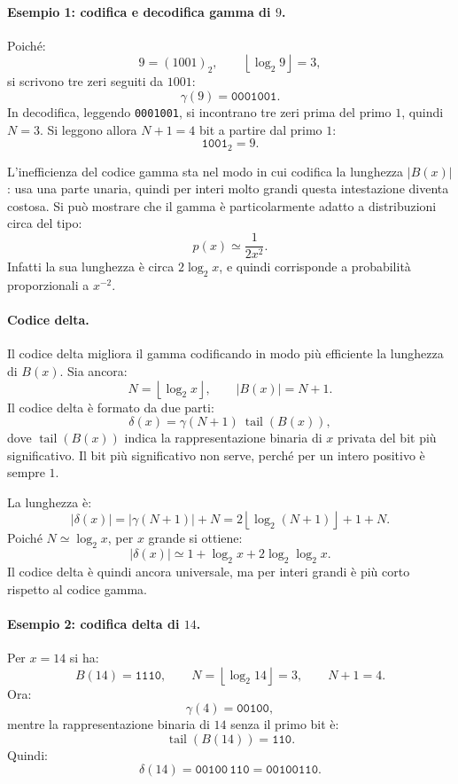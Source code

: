 \documentclass{article}
\theoremstyle{definition}
\numberwithin{equation}{section}
\begin{document}
\paragraph{Esempio 1: codifica e decodifica gamma di $9$.}
Poiché:
\[
    9=(1001)_2,
    \qquad
    \left\lfloor\log_2 9\right\rfloor=3,
\]
si scrivono tre zeri seguiti da $1001$:
\[
    \gamma(9)=\texttt{0001001}.
\]
In decodifica, leggendo \texttt{0001001}, si incontrano tre zeri prima del primo $1$, quindi $N=3$. Si leggono allora $N+1=4$ bit a partire dal primo $1$:
\[
    \texttt{1001}_2=9.
\]

L'inefficienza del codice gamma sta nel modo in cui codifica la lunghezza $|B(x)|$: usa una parte unaria, quindi per interi molto grandi questa intestazione diventa costosa. Si può mostrare che il gamma è particolarmente adatto a distribuzioni circa del tipo:
\[
    p(x)\simeq \frac{1}{2x^2}.
\]
Infatti la sua lunghezza è circa $2\log_2 x$, e quindi corrisponde a probabilità proporzionali a $x^{-2}$.

\paragraph{Codice delta.}
Il codice delta migliora il gamma codificando in modo più efficiente la lunghezza di $B(x)$. Sia ancora:
\[
    N=\left\lfloor\log_2 x\right\rfloor,
    \qquad |B(x)|=N+1.
\]
Il codice delta è formato da due parti:
\begin{equation}\label{eq:delta_code}
    \delta(x)=\gamma(N+1)\ \operatorname{tail}(B(x)),
\end{equation}
dove $\operatorname{tail}(B(x))$ indica la rappresentazione binaria di $x$ privata del bit più significativo. Il bit più significativo non serve, perché per un intero positivo è sempre $1$.

La lunghezza è:
\begin{equation}\label{eq:delta_length}
    |\delta(x)|
    =
    |\gamma(N+1)|+N
    =
    2\left\lfloor\log_2(N+1)\right\rfloor+1+N.
\end{equation}
Poiché $N\simeq\log_2 x$, per $x$ grande si ottiene:
\[
    |\delta(x)|
    \simeq
    1+\log_2 x+2\log_2\log_2 x.
\]
Il codice delta è quindi ancora universale, ma per interi grandi è più corto rispetto al codice gamma.

\paragraph{Esempio 2: codifica delta di $14$.}
Per $x=14$ si ha:
\[
    B(14)=\texttt{1110},
    \qquad
    N=\left\lfloor\log_2 14\right\rfloor=3,
    \qquad
    N+1=4.
\]
Ora:
\[
    \gamma(4)=\texttt{00100},
\]
mentre la rappresentazione binaria di $14$ senza il primo bit è:
\[
    \operatorname{tail}(B(14))=\texttt{110}.
\]
Quindi:
\[
    \delta(14)=\texttt{00100}\,\texttt{110}
    =
    \texttt{00100110}.
\]
\end{document}
